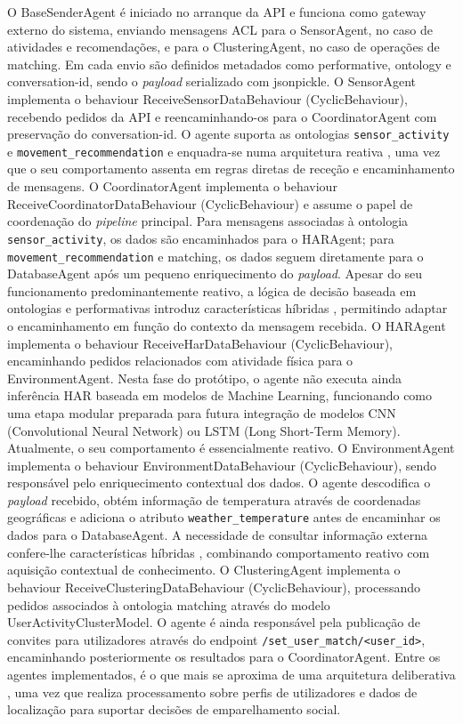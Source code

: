 \documentclass[runningheads]{llncs}
\begin{document}
O BaseSenderAgent é iniciado no arranque da API e funciona como gateway externo do sistema, enviando mensagens ACL para o SensorAgent, no caso de atividades e recomendações, e para o ClusteringAgent, no caso de operações de matching. Em cada envio são definidos metadados como performative, ontology e conversation-id, sendo o \textit{payload} serializado com jsonpickle. 
O SensorAgent implementa o behaviour ReceiveSensorDataBehaviour (CyclicBehaviour), recebendo pedidos da API e reencaminhando-os para o CoordinatorAgent com preservação do conversation-id. O agente suporta as ontologias \texttt{sensor\_activity} e \texttt{movement\_recommendation} e enquadra-se numa arquitetura reativa \cite{agentesinteligentes}, uma vez que o seu comportamento assenta em regras diretas de receção e encaminhamento de mensagens. 
O CoordinatorAgent implementa o behaviour ReceiveCoordinatorDataBehaviour (CyclicBehaviour) e assume o papel de coordenação do \textit{pipeline} principal. Para mensagens associadas à ontologia \texttt{sensor\_activity}, os dados são encaminhados para o HARAgent; para \texttt{movement\_recommendation} e matching, os dados seguem diretamente para o DatabaseAgent após um pequeno enriquecimento do \textit{payload}. Apesar do seu funcionamento predominantemente reativo, a lógica de decisão baseada em ontologias e performativas introduz características híbridas \cite{agentesinteligentes}, permitindo adaptar o encaminhamento em função do contexto da mensagem recebida. 
O HARAgent implementa o behaviour ReceiveHarDataBehaviour (CyclicBehaviour), encaminhando pedidos relacionados com atividade física para o EnvironmentAgent. Nesta fase do protótipo, o agente não executa ainda inferência HAR baseada em modelos de Machine Learning, funcionando como uma etapa modular preparada para futura integração de modelos CNN (Convolutional Neural Network) ou LSTM (Long Short-Term Memory). Atualmente, o seu comportamento é essencialmente reativo. 
O EnvironmentAgent implementa o behaviour EnvironmentDataBehaviour (CyclicBehaviour), sendo responsável pelo enriquecimento contextual dos dados. O agente descodifica o \textit{payload} recebido, obtém informação de temperatura através de coordenadas geográficas e adiciona o atributo \texttt{weather\_temperature} antes de encaminhar os dados para o DatabaseAgent. A necessidade de consultar informação externa confere-lhe características híbridas \cite{agentesinteligentes}, combinando comportamento reativo com aquisição contextual de conhecimento. 
O ClusteringAgent implementa o behaviour ReceiveClusteringDataBehaviour (CyclicBehaviour), processando pedidos associados à ontologia matching através do modelo UserActivityClusterModel. O agente é ainda responsável pela publicação de convites para utilizadores através do endpoint \texttt{/set\_user\_match/<user\_id>}, encaminhando posteriormente os resultados para o CoordinatorAgent. Entre os agentes implementados, é o que mais se aproxima de uma arquitetura deliberativa \cite{agentesinteligentes}, uma vez que realiza processamento sobre perfis de utilizadores e dados de localização para suportar decisões de emparelhamento social. 
\end{document}
